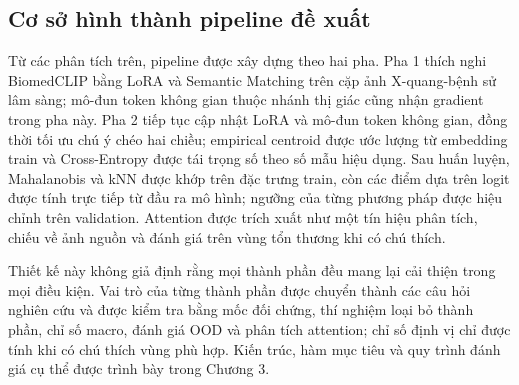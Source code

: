\subsection{Cơ sở hình thành pipeline đề xuất}

Từ các phân tích trên, pipeline được xây dựng theo hai pha. Pha 1 thích nghi BiomedCLIP bằng LoRA và Semantic Matching trên cặp ảnh X-quang-bệnh sử lâm sàng; mô-đun token không gian thuộc nhánh thị giác cũng nhận gradient trong pha này. Pha 2 tiếp tục cập nhật LoRA và mô-đun token không gian, đồng thời tối ưu chú ý chéo hai chiều; empirical centroid được ước lượng từ embedding train và Cross-Entropy được tái trọng số theo số mẫu hiệu dụng. Sau huấn luyện, Mahalanobis và kNN được khớp trên đặc trưng train, còn các điểm dựa trên logit được tính trực tiếp từ đầu ra mô hình; ngưỡng của từng phương pháp được hiệu chỉnh trên validation. Attention được trích xuất như một tín hiệu phân tích, chiếu về ảnh nguồn và đánh giá trên vùng tổn thương khi có chú thích.

Thiết kế này không giả định rằng mọi thành phần đều mang lại cải thiện trong mọi điều kiện. Vai trò của từng thành phần được chuyển thành các câu hỏi nghiên cứu và được kiểm tra bằng mốc đối chứng, thí nghiệm loại bỏ thành phần, chỉ số macro, đánh giá OOD và phân tích attention; chỉ số định vị chỉ được tính khi có chú thích vùng phù hợp. Kiến trúc, hàm mục tiêu và quy trình đánh giá cụ thể được trình bày trong Chương 3.
